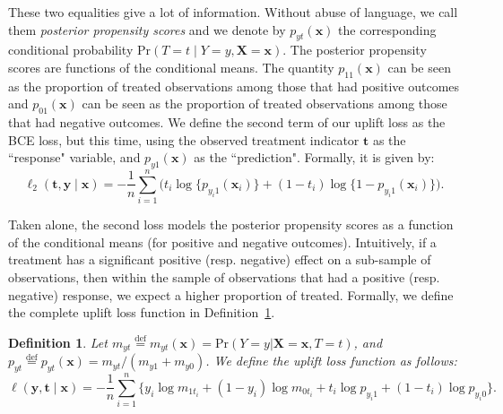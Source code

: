 \documentclass{article}
\def\tt{\mathbf t}
\def\x{\mathbf x}
\def\y{\mathbf y}
\newtheorem{definition}{Definition}
\begin{document}
These two equalities give a lot of information. Without abuse of language, we call them \textit{posterior propensity scores} and we denote by $p_{yt} (\x)$ the corresponding conditional probability $\mathrm{Pr}(T=t \mid Y=y, \boldsymbol X = \x)$. The posterior propensity scores are functions of the conditional means. %
The quantity $p_{11}(\x)$ can be seen as the proportion of treated observations among those that had positive outcomes and $p_{01}(\x)$ can be seen as the proportion of treated observations among those that had negative outcomes. %
We define the second term of our uplift loss as the BCE loss, but this time, using the observed treatment indicator $\tt$ as the ``response" variable, and $p_{y1}(\x)$ as the ``prediction". Formally, it is given by: $$ \ell_2(\tt, \y \mid \x) = -\frac{1}{n} \sum_{i=1}^n \Big(t_i \log\{p_{y_i 1}(\x_i)\} + (1 - t_i)\log\{1 - p_{y_i 1}(\x_i)\} \Big).$$


Taken alone, the second loss models the posterior propensity scores as a function of the conditional means (for positive and negative outcomes). Intuitively, if a treatment has a significant positive (resp. negative) effect on a sub-sample of observations, then within the sample of observations that had a positive (resp. negative) response, we expect a higher proportion of treated. Formally, we define the complete uplift loss function in Definition~\ref{def:augmented_loss}.\\

\begin{definition}\label{def:augmented_loss}
Let $m_{yt} \stackrel{\text{def}}{=} m_{yt}(\x) = \mathrm{Pr}( Y=y |\boldsymbol X =\x, T=t)$, and $p_{yt} \stackrel{\text{def}}{=} p_{yt} (\x) = m_{yt} / ( m_{y1} + m_{y0}) $. We define the uplift loss function as follows:
\begin{equation}
    \ell(\y , \tt \mid \x) = - \frac{1}{n} \sum_{i=1}^n \{y_i \log m_{ 1 t_i} + (1 - y_i)\log m_{0t_i } + t_i \log p_{y_i 1} + (1 - t_i)\log p_{y_i 0} \} .
    \label{eq:augmented_loss_function}
\end{equation}
\end{definition}
\end{document}

